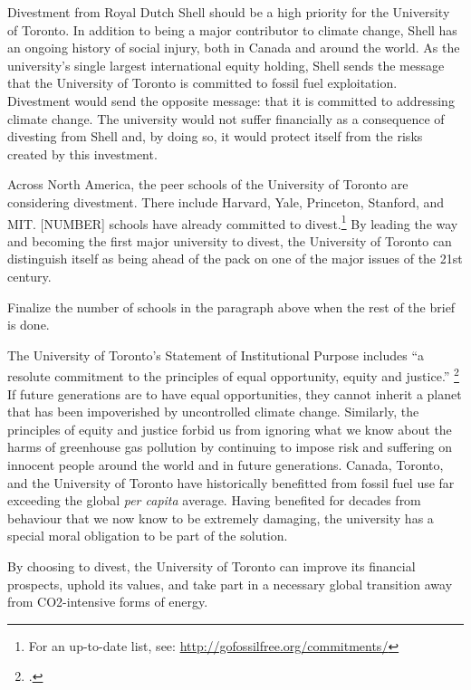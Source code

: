 Divestment from Royal Dutch Shell should be a high priority for the University of Toronto. 
In addition to being a major contributor to climate change, Shell has an ongoing history of social injury, both in Canada and around the world. 
As the university's single largest international equity holding, Shell sends the message that the University of Toronto is committed to fossil fuel exploitation. 
Divestment would send the opposite message: that it is committed to addressing climate change.  
The university would not suffer financially as a consequence of divesting from Shell and, by doing so, it would protect itself from the risks created by this investment.



Across North America, the peer schools of the University of Toronto are considering divestment.
There include Harvard, Yale, Princeton, Stanford, and MIT.
[NUMBER] schools have already committed to divest.\footnote{For an up-to-date list, see: \url{http://gofossilfree.org/commitments/}}
By leading the way and becoming the first major university to divest, the University of Toronto can distinguish itself as being ahead of the pack on one of the major issues of the 21st century.



\begin{vcom}
Finalize the number of schools in the paragraph above when the rest of the brief is done.
\end{vcom}



The University of Toronto's Statement of Institutional Purpose includes ``a resolute commitment to the principles of equal opportunity, equity and justice.'' \footcite{InstitutionalPurpose}
If future generations are to have equal opportunities, they cannot inherit a planet that has been impoverished by uncontrolled climate change.
Similarly, the principles of equity and justice forbid us from ignoring what we know about the harms of greenhouse gas pollution by continuing to impose risk and suffering on innocent people around the world and in future generations.
Canada, Toronto, and the University of Toronto have historically benefitted from fossil fuel use far exceeding the global \emph{per capita} average.
Having benefited for decades from behaviour that we now know to be extremely damaging, the university has a special moral obligation to be part of the solution.



By choosing to divest, the University of Toronto can improve its financial prospects, uphold its values, and take part in a necessary global transition away from CO2-intensive forms of energy. 



